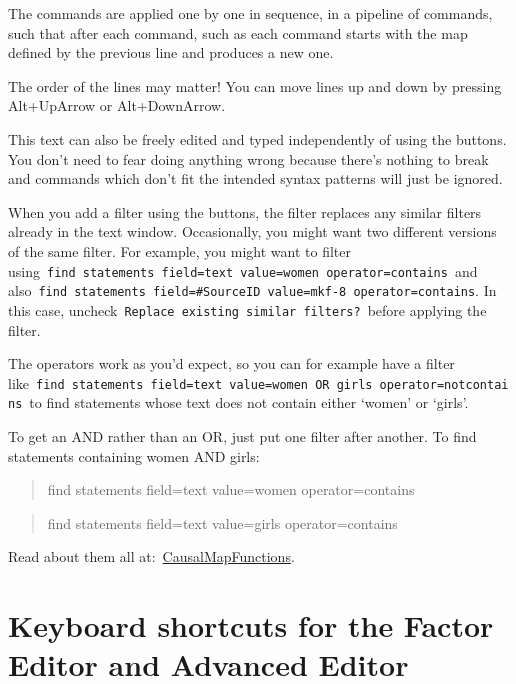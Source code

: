 \documentclass[
]{book}
\begin{document}
The commands are applied one by one in sequence, in a pipeline of commands, such that after each command, such as each command starts with the map defined by the previous line and produces a new one.

The order of the lines may matter! You can move lines up and down by pressing Alt+UpArrow or Alt+DownArrow.

This text can also be freely edited and typed independently of using the buttons. You don't need to fear doing anything wrong because there's nothing to break and commands which don't fit the intended syntax patterns will just be ignored.

When you add a filter using the buttons, the filter replaces any similar filters already in the text window. Occasionally, you might want two different versions of the same filter. For example, you might want to filter using~\texttt{find\ statements\ field=text\ value=women\ operator=contains}~and also~\texttt{find\ statements\ field=\#SourceID\ value=mkf-8\ operator=contains}. In this case, uncheck~\texttt{Replace\ existing\ similar\ filters?}~before applying the filter.

The operators work as you'd expect, so you can for example have a filter like~\texttt{find\ statements\ field=text\ value=women\ OR\ girls\ operator=notcontains}~to find statements whose text does not contain either `women' or `girls'.

To get an AND rather than an OR, just put one filter after another. To find statements containing women AND girls:

\begin{quote}
find statements field=text value=women operator=contains
\end{quote}

\begin{quote}
find statements field=text value=girls operator=contains
\end{quote}

Read about them all at:~\href{https://stevepowell99.github.io/CausalMapFunctions/reference/index.html}{CausalMapFunctions}.

\hypertarget{keyboard-shortcuts-for-the-factor-editor-and-advanced-editor}{%
\chapter{Keyboard shortcuts for the Factor Editor and Advanced Editor}\label{keyboard-shortcuts-for-the-factor-editor-and-advanced-editor}}
\end{document}
